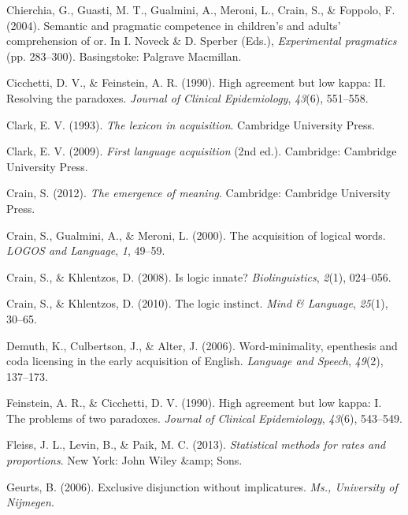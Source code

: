 \documentclass[,man,floatsintext]{apa6}
\begin{document}
\leavevmode\hypertarget{ref-chierchia2004semantic}{}%
Chierchia, G., Guasti, M. T., Gualmini, A., Meroni, L., Crain, S., \& Foppolo, F. (2004). Semantic and pragmatic competence in children's and adults' comprehension of or. In I. Noveck \& D. Sperber (Eds.), \emph{Experimental pragmatics} (pp. 283--300). Basingstoke: Palgrave Macmillan.

\leavevmode\hypertarget{ref-cicchetti1990high}{}%
Cicchetti, D. V., \& Feinstein, A. R. (1990). High agreement but low kappa: II. Resolving the paradoxes. \emph{Journal of Clinical Epidemiology}, \emph{43}(6), 551--558.

\leavevmode\hypertarget{ref-clark1993lexicon}{}%
Clark, E. V. (1993). \emph{The lexicon in acquisition}. Cambridge University Press.

\leavevmode\hypertarget{ref-clark2009first}{}%
Clark, E. V. (2009). \emph{First language acquisition} (2nd ed.). Cambridge: Cambridge University Press.

\leavevmode\hypertarget{ref-crain2012emergence}{}%
Crain, S. (2012). \emph{The emergence of meaning}. Cambridge: Cambridge University Press.

\leavevmode\hypertarget{ref-crain2000acquisition}{}%
Crain, S., Gualmini, A., \& Meroni, L. (2000). The acquisition of logical words. \emph{LOGOS and Language}, \emph{1}, 49--59.

\leavevmode\hypertarget{ref-crain2008logic}{}%
Crain, S., \& Khlentzos, D. (2008). Is logic innate? \emph{Biolinguistics}, \emph{2}(1), 024--056.

\leavevmode\hypertarget{ref-crain2010logic}{}%
Crain, S., \& Khlentzos, D. (2010). The logic instinct. \emph{Mind \& Language}, \emph{25}(1), 30--65.

\leavevmode\hypertarget{ref-demuth2006word}{}%
Demuth, K., Culbertson, J., \& Alter, J. (2006). Word-minimality, epenthesis and coda licensing in the early acquisition of English. \emph{Language and Speech}, \emph{49}(2), 137--173.

\leavevmode\hypertarget{ref-feinstein1990high}{}%
Feinstein, A. R., \& Cicchetti, D. V. (1990). High agreement but low kappa: I. The problems of two paradoxes. \emph{Journal of Clinical Epidemiology}, \emph{43}(6), 543--549.

\leavevmode\hypertarget{ref-fleiss2013statistical}{}%
Fleiss, J. L., Levin, B., \& Paik, M. C. (2013). \emph{Statistical methods for rates and proportions}. New York: John Wiley \&amp; Sons.

\leavevmode\hypertarget{ref-geurts2006exclusive}{}%
Geurts, B. (2006). Exclusive disjunction without implicatures. \emph{Ms., University of Nijmegen}.
\end{document}
